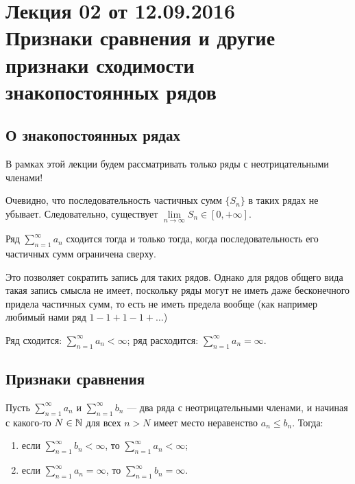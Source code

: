 \documentclass[a4paper, 12pt]{article}
\begin{document}
\pagestyle{fancy}
\section{Лекция 02 от 12.09.2016 \\Признаки сравнения и другие признаки сходимости знакопостоянных рядов}

\subsection{О знакопостоянных рядах}

В рамках этой лекции будем рассматривать только ряды с неотрицательными членами!

Очевидно, что последовательность частичных сумм $\{S_n \}$ в таких рядах не убывает. Следовательно, существует $\lim\limits_{n\rightarrow \infty}S_n \in [0, +\infty]$.

\begin{Statement}
	Ряд $\sum\limits_{n=1}^{\infty} a_n$ сходится тогда и только тогда, когда последовательность его частичных сумм ограничена сверху.
\end{Statement}

Это позволяет сократить запись для таких рядов. Однако для рядов общего вида такая запись смысла не имеет, поскольку ряды могут не иметь даже бесконечного придела частичных сумм, то есть не иметь предела вообще (как например любимый нами ряд $1 - 1 + 1 - 1 + \ldots$)
\begin{Designation} Ряд сходится: $\sum\limits_{n=1}^{\infty} a_n < \infty$; ряд расходится: $\sum\limits_{n=1}^{\infty} a_n = \infty$.
\end{Designation}

\subsection{Признаки сравнения}

\begin{Test}
	Пусть $\sum\limits_{n=1}^{\infty} a_n$ и $\sum\limits_{n=1}^{\infty} b_n$ --- два ряда с неотрицательными членами, и начиная с какого-то $N\in \mathbb{N}$ для всех $n > N$ имеет место неравенство $a_n \le b_n$. Тогда:
	\begin{enumerate}
	\item если $\sum\limits_{n=1}^{\infty} b_n < \infty$, то $\sum\limits_{n=1}^{\infty} a_n < \infty$;
	\item если $\sum\limits_{n=1}^{\infty} a_n = \infty$, то $\sum\limits_{n=1}^{\infty} b_n = \infty$.
	\end{enumerate}
\end{Test}
\end{document}
